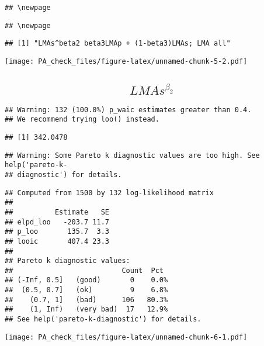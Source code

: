 \documentclass[12pt,]{article}
\begin{document}
\begin{verbatim}
## \newpage
\end{verbatim}

\begin{verbatim}
## \newpage
\end{verbatim}

\begin{verbatim}
## [1] "LMAs^beta2 beta3LMAp + (1-beta3)LMAs; LMA all"
\end{verbatim}

\texttt{[image: PA\_check\_files/figure-latex/unnamed-chunk-5-2.pdf]}

\subsection{\texorpdfstring{\[LMAs^{\beta_2}\]}{LMAs\^{}\{\textbackslash{}beta\_2\}}}\label{lmasbeta_2}

\begin{verbatim}
## Warning: 132 (100.0%) p_waic estimates greater than 0.4.
## We recommend trying loo() instead.
\end{verbatim}

\begin{verbatim}
## [1] 342.0478
\end{verbatim}

\begin{verbatim}
## Warning: Some Pareto k diagnostic values are too high. See help('pareto-k-
## diagnostic') for details.
\end{verbatim}

\begin{verbatim}
## Computed from 1500 by 132 log-likelihood matrix
## 
##          Estimate   SE
## elpd_loo   -203.7 11.7
## p_loo       135.7  3.3
## looic       407.4 23.3
## 
## Pareto k diagnostic values:
##                          Count  Pct 
## (-Inf, 0.5]   (good)       0    0.0%
##  (0.5, 0.7]   (ok)         9    6.8%
##    (0.7, 1]   (bad)      106   80.3%
##    (1, Inf)   (very bad)  17   12.9%
## See help('pareto-k-diagnostic') for details.
\end{verbatim}

\texttt{[image: PA\_check\_files/figure-latex/unnamed-chunk-6-1.pdf]}
\end{document}
